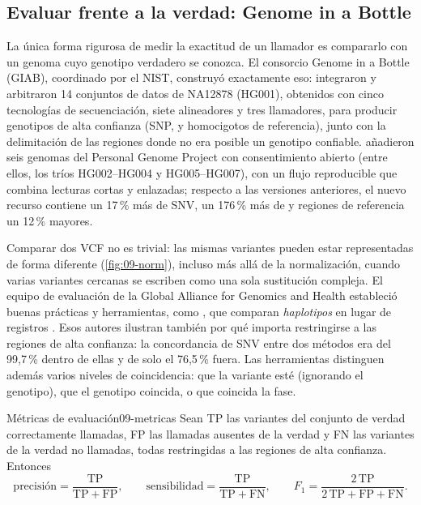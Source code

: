 \subsection{Evaluar frente a la verdad: Genome in a Bottle}

La única forma rigurosa de medir la exactitud de un llamador es compararlo con un genoma cuyo genotipo verdadero se conozca. El consorcio Genome in a Bottle (GIAB), coordinado por el NIST, construyó exactamente eso: \textcite{c09-zook2014} integraron y arbitraron 14 conjuntos de datos de NA12878 (HG001), obtenidos con cinco tecnologías de secuenciación, siete alineadores y tres llamadores, para producir genotipos de alta confianza (SNP,  y homocigotos de referencia), junto con la delimitación de las regiones donde no era posible un genotipo confiable. \textcite{c09-zook2019} añadieron seis genomas del Personal Genome Project con consentimiento abierto (entre ellos, los tríos HG002--HG004 y HG005--HG007), con un flujo reproducible que combina lecturas cortas y enlazadas; respecto a las versiones anteriores, el nuevo recurso contiene un 17\,\% más de SNV, un 176\,\% más de  y regiones de referencia un 12\,\% mayores.

Comparar dos VCF no es trivial: las mismas variantes pueden estar representadas de forma diferente (\cref{fig:09-norm}), incluso más allá de la normalización, cuando varias variantes cercanas se escriben como una sola sustitución compleja. El equipo de evaluación de la Global Alliance for Genomics and Health estableció buenas prácticas y herramientas, como , que comparan \emph{haplotipos} en lugar de registros \parencite{c09-krusche2019}. Esos autores ilustran también por qué importa restringirse a las regiones de alta confianza: la concordancia de SNV entre dos métodos era del 99,7\,\% dentro de ellas y de solo el 76,5\,\% fuera. Las herramientas distinguen además varios niveles de coincidencia: que la variante esté (ignorando el genotipo), que el genotipo coincida, o que coincida la fase.

\begin{definicion}{Métricas de evaluación}{09-metricas}
Sean TP las variantes del conjunto de verdad correctamente llamadas, FP las llamadas ausentes de la verdad y FN las variantes de la verdad no llamadas, todas restringidas a las regiones de alta confianza. Entonces
\begin{equation}\label{eq:09-metricas}
\text{precisión} = \frac{\mathrm{TP}}{\mathrm{TP}+\mathrm{FP}},\qquad
\text{sensibilidad} = \frac{\mathrm{TP}}{\mathrm{TP}+\mathrm{FN}},\qquad
F_1 = \frac{2\,\mathrm{TP}}{2\,\mathrm{TP}+\mathrm{FP}+\mathrm{FN}}.
\end{equation}
\end{definicion}

